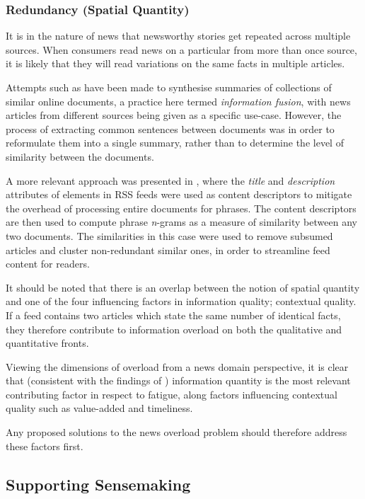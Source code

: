 \subsubsection{Redundancy (Spatial Quantity)}
It is in the nature of news that newsworthy stories get repeated across multiple sources. When consumers read news on a particular from more than once source, it is likely that they will read variations on the same facts in multiple articles.

Attempts such as \citep{InformationFusionInTheContextOfMultiDocumentSummarization} have been made to synthesise summaries of collections of similar online documents, a practice here termed \textit{information fusion}, with news articles from different sources being given as a specific use-case. However, the process of extracting common sentences between documents was in order to reformulate them into a single summary, rather than to determine the level of similarity between the documents.

A more relevant approach was presented in \citep{UtilizingPhraseSimilarityMeasures}, where the \textit{title} and \textit{description} attributes of elements in RSS feeds were used as content descriptors to mitigate the overhead of processing entire documents for phrases. The content descriptors are then used to compute phrase \textit{n}-grams as a measure of similarity between any two documents. The similarities in this case were used to remove subsumed articles and cluster non-redundant similar ones, in order to streamline feed content for readers.

It should be noted that there is an overlap between the notion of spatial quantity and one of the four influencing factors in information quality; contextual quality. If a feed contains two articles which state the same number of identical facts, they therefore contribute to information overload on both the qualitative and quantitative fronts.

Viewing the dimensions of overload from a news domain perspective, it is clear that (consistent with the findings of \citet{TowardsAnOptimalResolutionToInformationOverload}) information quantity is the most relevant contributing factor in respect to fatigue, along factors influencing contextual quality such as value-added and timeliness.

Any proposed solutions to the news overload problem should therefore address these factors first.

\subsection{Supporting Sensemaking}

